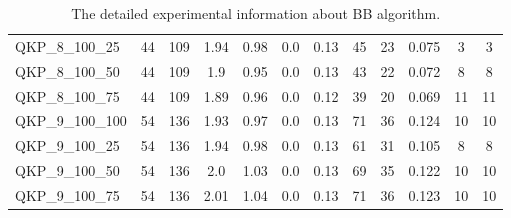 \begin{table}[!h]
{\begin{tabular}{lccccccccccc}
QKP\_8\_100\_25 & 44 & 109 & 1.94 & 0.98 & 0.0 & 0.13 & 45 & 23 & 0.075 & 3 & 3\\
QKP\_8\_100\_50 & 44 & 109 & 1.9 & 0.95 & 0.0 & 0.13 & 43 & 22 & 0.072 & 8 & 8\\
QKP\_8\_100\_75 & 44 & 109 & 1.89 & 0.96 & 0.0 & 0.12 & 39 & 20 & 0.069 & 11 & 11\\
QKP\_9\_100\_100 & 54 & 136 & 1.93 & 0.97 & 0.0 & 0.13 & 71 & 36 & 0.124 & 10 & 10\\
QKP\_9\_100\_25 & 54 & 136 & 1.94 & 0.98 & 0.0 & 0.13 & 61 & 31 & 0.105 & 8 & 8\\
QKP\_9\_100\_50 & 54 & 136 & 2.0 & 1.03 & 0.0 & 0.13 & 69 & 35 & 0.122 & 10 & 10\\
QKP\_9\_100\_75 & 54 & 136 & 2.01 & 1.04 & 0.0 & 0.13 & 71 & 36 & 0.123 & 10 & 10\\
\bottomrule
\end{tabular}%
}%
\caption{The detailed experimental information about BB algorithm.}
\label{tab:table_$m}
\end{table}

